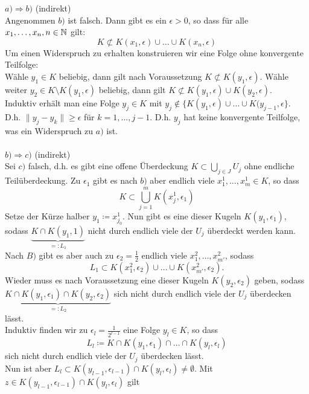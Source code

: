 \begin{beweis}
	$a) \Rightarrow  b)$ (indirekt) \\
	Angenommen $b)$ ist falsch. Dann gibt es ein $\epsilon > 0$, so dass für alle $x_{1}, \dotsc, x_{n}, n \in \mathbb{N}$ gilt:
	\[ K \not\subset K(x_{1}, \epsilon) \cup \dotsc \cup K(x_{n}, \epsilon) \]
	Um einen Widerspruch zu erhalten konstruieren wir eine Folge ohne konvergente Teilfolge: \\
	Wähle $y_{1} \in K$ beliebig, dann gilt nach Voraussetzung $K \not\subset K(y_{1}, \epsilon)$.
	Wähle weiter $y_{2} \in K \setminus K(y_{1}, \epsilon)$ beliebig, dann gilt $K \not\subset K(y_{1}, \epsilon) \cup K(y_{2}, \epsilon)$. \\
	Induktiv erhält man eine Folge $y_{j} \in K$ mit $y_{j} \notin \{ K(y_{1}, \epsilon) \cup \dotsc \cup K(y_{j - 1}, \epsilon \}$. \\
	D.h. $\|y_{j} - y_{k} \| \geq \epsilon$ für $k = 1, \dotsc, j - 1$. D.h. $y_{j}$ hat keine konvergente Teilfolge, was ein Widerspruch zu $a)$ ist. \\ \\
	$b) \Rightarrow c)$ (indirekt) \\
	Sei $c)$ falsch, d.h. es gibt eine offene Überdeckung $K \subset \bigcup_{j \in J} U_{j}$ ohne endliche Teilüberdeckung.
	Zu $\epsilon_{1}$ gibt es nach $b)$ aber endlich viele $x_{1}^{1}, ..., x_{m}^{1} \in K$, so dass 
	\[ K \subset \bigcup_{j = 1}^{m} K(x_{j}^{1}, \epsilon_{1}) \]
	Setze der Kürze halber $y_{1} \coloneqq x_{j_{0}}^{1}$. Nun gibt es eine dieser Kugeln $K(y_{1}, \epsilon_{1})$, sodass $\underbrace{K \cap K(y_{1}, 1)}_{=: L_{1}}$ nicht durch endlich viele der $U_{j}$ überdeckt werden kann. \\
	Nach $B)$ gibt es aber auch zu $\epsilon_{2} = \frac{1}{2}$ endlich viele $x_{1}^{2}, \dotsc, x_{m'}^{2}$, sodass 
	\[ L_{1} \subset K(x_{1}^{2}, \epsilon_{2}) \cup \dotsc \cup K(x_{m'}^{2}, \epsilon_{2}). \] 
	Wieder muss es nach Voraussetzung eine dieser Kugeln $K(y_{2}, \epsilon_{2})$ geben, sodass $\underbrace{K \cap K(y_{1}, \epsilon_{1}) \cap K(y_{2}, \epsilon_{2})}_{=: L_{2}}$ sich nicht durch endlich viele der $U_{j}$ überdecken lässt. \\
	Induktiv finden wir zu $\epsilon_{l} = \frac{1}{2^{l - 1}}$ eine Folge $y_{l} \in K$, so dass
	\[ L_{l} \coloneqq K \cap K(y_{1}, \epsilon_{1}) \cap \dotsc \cap K(y_{l}, \epsilon_{l}) \]
	sich nicht durch endlich viele der $U_{j}$ überdecken lässt. \\
	Nun ist aber $L_{l} \subset K(y_{l - 1}, \epsilon_{l - 1}) \cap K(y_{l}, \epsilon_{l}) \neq \emptyset$. Mit $z \in K(y_{l - 1}, \epsilon_{l - 1}) \cap K(y_{l}, \epsilon_{l})$ gilt

\end{beweis}
